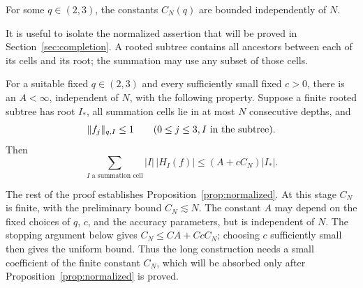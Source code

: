 \begin{theorem}\label{thm:local}
For some $q\in(2,3)$, the constants $C_N(q)$ are bounded independently
of $N$.
\end{theorem}

It is useful to isolate the normalized assertion that will be proved
in Section~\ref{sec:completion}.  A rooted subtree contains all
ancestors between each of its cells and its root; the summation may use
any subset of those cells.

\begin{proposition}\label{prop:normalized}
For a suitable fixed $q\in(2,3)$ and every sufficiently small fixed
$c>0$, there is an $A<\infty$, independent of $N$, with the following
property.  Suppose a finite rooted subtree has root $I_*$, all summation
cells lie in at most $N$ consecutive depths, and
\[
 \lVert f_j\rVert_{q,I}\le1
 \qquad(0\le j\le3, I\text{ in the subtree}).
\]
Then
\[
 \sum_{I\text{ a summation cell}}|I|\,|H_I(f)|
 \le (A+cC_N)|I_*|.
\]
\end{proposition}

The rest of the proof establishes Proposition~\ref{prop:normalized}.
At this stage $C_N$ is finite, with the preliminary bound $C_N\lesssim N$.
The constant $A$ may depend on the fixed choices of $q$, $c$, and the
accuracy parameters, but is independent of $N$.  The stopping argument
below gives $C_N\le C A+C cC_N$; choosing $c$ sufficiently small then
gives the uniform bound.  Thus the long construction needs a small
coefficient of the finite constant $C_N$, which will be absorbed only
after Proposition~\ref{prop:normalized} is proved.

